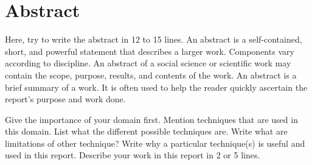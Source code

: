 \vspace{1in}
\chapter*{Abstract}

Here, try to write the abstract in 12 to 15 lines. An abstract is a self-contained, short, and powerful statement that describes a larger work. Components vary according to discipline. An abstract of a social science or scientific work may contain the scope, purpose, results, and contents of the work. An abstract is a brief summary of a work. It is often used to help the reader quickly ascertain the report's purpose and work done. 

Give the importance of your domain first. Mention techniques that are used in this domain. List what the different possible techniques are. Write what are limitations of other technique? Write why a particular technique(s) is useful and used in this report. Describe your work in this report in 2 or 5 lines.
